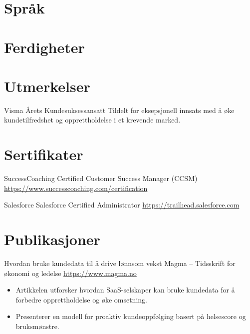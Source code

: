 \documentclass[a4paper, serif, 10pt]{moderncv}
\begin{document}
\section{Språk}

\section{Ferdigheter}

\section{Utmerkelser}

        {Visma}
        {Årets Kundesuksessansatt}
        {}
        {}
        {Tildelt for eksepsjonell innsats med å øke kundetilfredshet og opprettholdelse i et krevende marked.}
\section{Sertifikater}

        {SuccessCoaching}
        {Certified Customer Success Manager (CCSM)}
        {\url{https://www.successcoaching.com/certification}}
        {}
        {}

        {Salesforce}
        {Salesforce Certified Administrator}
        {\url{https://trailhead.salesforce.com}}
        {}
        {}
\section{Publikasjoner}

        {Hvordan bruke kundedata til å drive lønnsom vekst}
        {Magma – Tidsskrift for økonomi og ledelse}
        {\url{https://www.magma.no}}
        {}
        {\begin{itemize}
\item Artikkelen utforsker hvordan SaaS-selskaper kan bruke kundedata for å forbedre opprettholdelse og øke omsetning.
\item Presenterer en modell for proaktiv kundeoppfølging basert på helsescore og bruksmønstre.
\end{itemize}}
\end{document}
